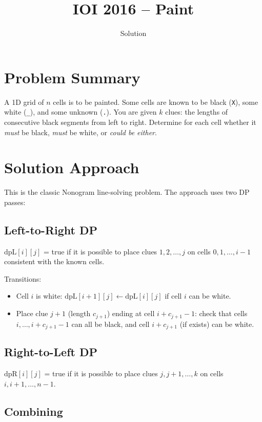 \documentclass[11pt,a4paper]{article}
\title{IOI 2016 -- Paint}
\author{Solution}
\date{}
\begin{document}
\maketitle

\section{Problem Summary}

A 1D grid of $n$ cells is to be painted. Some cells are known to be black (\texttt{X}), some white (\texttt{\_}), and some unknown (\texttt{.}). You are given $k$ clues: the lengths of consecutive black segments from left to right. Determine for each cell whether it \emph{must} be black, \emph{must} be white, or \emph{could be either}.

\section{Solution Approach}

This is the classic Nonogram line-solving problem. The approach uses two DP passes:

\subsection{Left-to-Right DP}

$\text{dpL}[i][j]$ = true if it is possible to place clues $1, 2, \ldots, j$ on cells $0, 1, \ldots, i-1$ consistent with the known cells.

Transitions:
\begin{itemize}
  \item Cell $i$ is white: $\text{dpL}[i+1][j] \gets \text{dpL}[i][j]$ if cell $i$ can be white.
  \item Place clue $j+1$ (length $c_{j+1}$) ending at cell $i + c_{j+1} - 1$: check that cells $i, \ldots, i+c_{j+1}-1$ can all be black, and cell $i + c_{j+1}$ (if exists) can be white.
\end{itemize}

\subsection{Right-to-Left DP}

$\text{dpR}[i][j]$ = true if it is possible to place clues $j, j+1, \ldots, k$ on cells $i, i+1, \ldots, n-1$.

\subsection{Combining}
\end{document}
